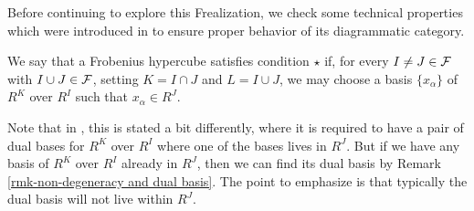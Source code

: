 {%

}

Before continuing to explore this Frealization, we check some technical properties which were introduced in \cite{EWSFrob} to ensure proper behavior of its diagrammatic category.

\begin{defn}\cite[Definition 1.7]{EWSFrob}\label{defn-condition star} We say that a Frobenius hypercube satisfies condition $\star$ if, for every $I \ne J \in \mathcal{F}$ with $I \cup J \in \mathcal{F}$, setting $K = I \cap J$ and $L = I \cup J$, we may choose a basis $\{x_\alpha\}$ of $R^K$ over $R^I$ such that $x_\alpha \in R^J$. \end{defn}
Note that in \cite{EWSFrob}, this is stated a bit differently, where it is required to have a pair of dual bases for $R^K$ over $R^I$ where one of the bases lives in $R^J$. 
But if we have any basis of $R^K$ over $R^I$ already in $R^J$, then we can find its dual basis by Remark \ref{rmk-non-degeneracy and dual basis}. The point to emphasize is that typically the dual basis will not live within $R^J$.

